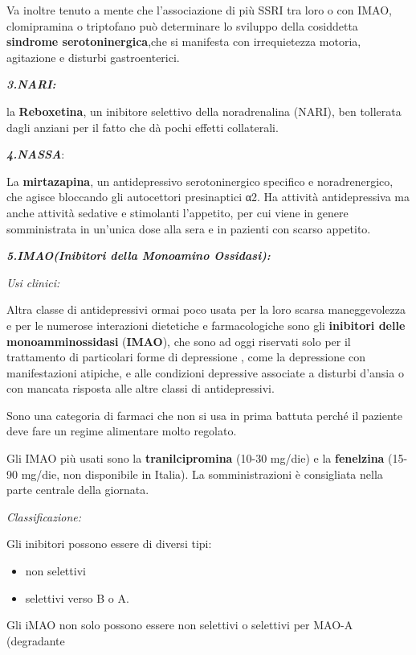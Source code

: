 \documentclass[]{article}
\begin{document}
Va inoltre tenuto a mente che l'associazione di più SSRI tra loro o con
IMAO, clomipramina o triptofano può determinare lo sviluppo della
cosiddetta \textbf{sindrome serotoninergica},che si manifesta con
irrequietezza motoria, agitazione e disturbi gastroenterici.

\textbf{\emph{3.NARI:}}

la \textbf{Reboxetina}, un inibitore selettivo della noradrenalina
(NARI), ben tollerata dagli anziani per il fatto che dà pochi effetti
collaterali.

\textbf{\emph{4.NASSA}}:

La \textbf{mirtazapina}, un antidepressivo serotoninergico specifico e
noradrenergico, che agisce bloccando gli autocettori presinaptici α2. Ha
attività antidepressiva ma anche attività sedative e stimolanti
l'appetito, per cui viene in genere somministrata in un'unica dose alla
sera e in pazienti con scarso appetito.

\textbf{\emph{5.IMAO(Inibitori della Monoamino Ossidasi):}}

\emph{\emph{Usi clinici:}}

Altra classe di antidepressivi ormai poco usata per la loro scarsa
maneggevolezza e per le numerose interazioni dietetiche e farmacologiche
sono gli \textbf{inibitori delle monoamminossidasi} (\textbf{IMAO}), che
sono ad oggi riservati solo per il trattamento di particolari forme di
depressione , come la depressione con manifestazioni atipiche, e alle
condizioni depressive associate a disturbi d'ansia o con mancata
risposta alle altre classi di antidepressivi.

Sono una categoria di farmaci che non si usa in prima battuta perché il
paziente deve fare un regime alimentare molto regolato.

Gli IMAO più usati sono la \textbf{tranilcipromina} (10-30 mg/die) e la
\textbf{fenelzina} (15-90 mg/die, non disponibile in Italia). La
somministrazioni è consigliata nella parte centrale della giornata.

\emph{\emph{Classificazione:}}

Gli inibitori possono essere di diversi tipi:

\begin{itemize}
\item
  non selettivi
\item
  selettivi verso B o A.
\end{itemize}

Gli iMAO non solo possono essere non selettivi o selettivi per MAO-A
(degradante
\end{document}

